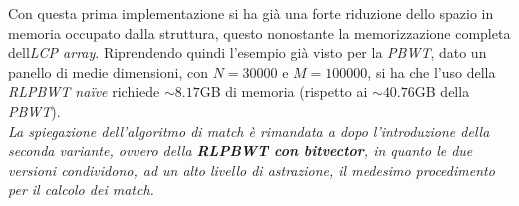 Con questa prima implementazione si ha già una forte riduzione dello spazio in
memoria occupato dalla 
struttura, questo nonostante la memorizzazione completa dell\textit{LCP array}.
Riprendendo quindi l'esempio già visto per la \textit{PBWT}, dato un panello di
medie dimensioni, con $N=30000$ e $M=100000$, si ha che l'uso della
\textit{RLPBWT na\"{i}ve} richiede $\sim 8.17$GB di memoria (rispetto ai
$\sim 40.76$GB della \textit{PBWT}).\\
\textit{La spiegazione dell'algoritmo di match è rimandata a dopo l'introduzione
  della seconda variante, ovvero della \textbf{RLPBWT con bitvector}, in quanto
  le due versioni condividono, ad un alto livello di astrazione, il medesimo
  procedimento per il calcolo dei match.}